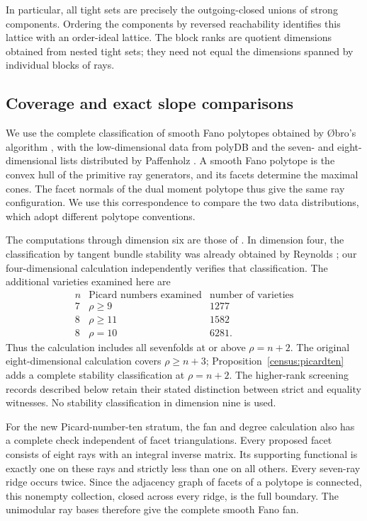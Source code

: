 In particular, all tight sets are precisely the outgoing-closed unions
of strong components. Ordering the components by reversed reachability
identifies this lattice with an order-ideal lattice. The block ranks
are quotient dimensions obtained from nested tight sets; they need
not equal the dimensions spanned by individual blocks of rays.

\subsection{Coverage and exact slope comparisons}

We use the complete classification of smooth Fano polytopes obtained
by \O bro's algorithm \cite{Obro2007}, with the low-dimensional data
from polyDB and the seven- and eight-dimensional lists distributed
by Paffenholz \cite{polyDB}.  A smooth Fano polytope is the convex hull
of the primitive ray generators, and its facets determine the maximal
cones.  The facet normals of the dual moment polytope thus give the
same ray configuration. We use this correspondence to compare the two
data distributions, which adopt different polytope conventions.

The computations through dimension six are those of
\cite{Wuebben2026}.  In dimension four, the classification by tangent
bundle stability was already obtained by Reynolds
\cite[Appendix~A]{Reynolds2023}; our four-dimensional calculation
independently verifies that classification.
The additional varieties examined here are
\[
 \begin{array}{c|c|r}
 n&\text{Picard numbers examined}&\text{number of varieties}\\ \hline
 7&\rho\ge9&1277\\
 8&\rho\ge11&1582\\
 8&\rho=10&6281.
 \end{array}
\]
Thus the calculation includes all sevenfolds at or above $\rho=n+2$.
The original eight-dimensional calculation covers $\rho\ge n+3$;
Proposition~\ref{census:picardten} adds a complete stability classification
at $\rho=n+2$. The higher-rank screening records described below retain
their stated distinction between strict and equality witnesses.
No stability classification in dimension nine is used.

For the new Picard-number-ten stratum, the fan and degree calculation
also has a complete check independent of facet triangulations. Every
proposed facet consists of eight rays with an integral inverse matrix.
Its supporting functional is exactly one on these rays and strictly
less than one on all others. Every seven-ray ridge occurs twice.
Since the adjacency graph of facets of a polytope is connected, this
nonempty collection, closed across every ridge, is the full boundary.
The unimodular ray bases therefore give the complete smooth Fano fan.

